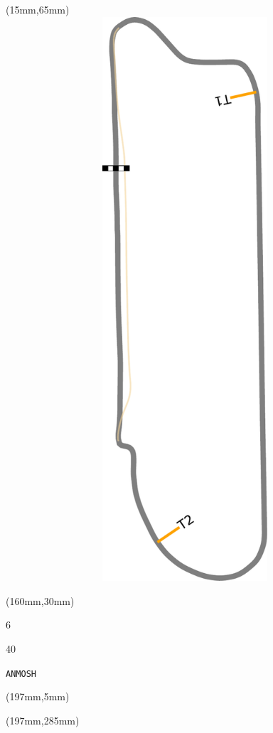 \begin{textblock*}{185mm}(15mm,65mm)%
\centering
\mbox{\includegraphics[width=185mm,height=210mm,keepaspectratio]{PT/ANMOSH.pdf}}
\end{textblock*}
\begin{textblock*}{40mm}(160mm,30mm)%
\Large
\par{} 
\par6 
\par40 
\par\hfill\tiny\tt ANMOSH\\
\end{textblock*}
\begin{textblock*}{20mm}(197mm,5mm)%
\fbox{\thepage}
\label{ANMOSH}
\end{textblock*}
\begin{textblock*}{20mm}(197mm,285mm)%
\fbox{\thepage}
\end{textblock*}

